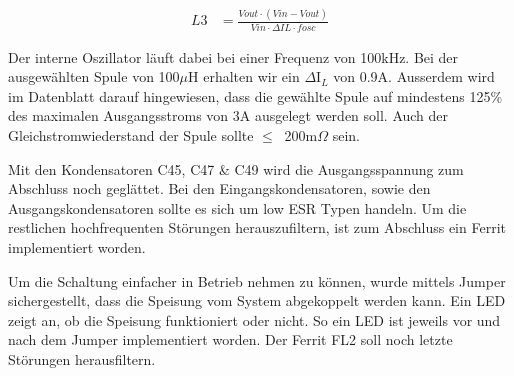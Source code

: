 \begin{align}
L3 &= \frac{Vout \cdot (Vin-Vout)}{Vin \cdot \Delta IL \cdot fosc}
\label{equ:12V_Spulenberechnung}
\end{align}

Der interne Oszillator läuft dabei bei einer Frequenz von 100kHz. Bei der ausgewählten Spule von 100$\mu$H erhalten wir ein $\Delta$I$_{L}$ von 0.9A. Ausserdem wird im Datenblatt darauf hingewiesen, dass die gewählte Spule auf mindestens 125\% des maximalen Ausgangsstroms von 3A ausgelegt werden soll. Auch der Gleichstromwiederstand der Spule sollte $ \leq \ $ 200m$\Omega$  sein. 

Mit den Kondensatoren C45, C47 \& C49 wird die Ausgangsspannung zum Abschluss noch geglättet. Bei den Eingangskondensatoren, sowie den Ausgangskondensatoren sollte es sich um low ESR Typen handeln. Um die restlichen hochfrequenten Störungen herauszufiltern, ist zum Abschluss ein Ferrit implementiert worden.

Um die Schaltung einfacher in Betrieb nehmen zu können, wurde mittels Jumper sichergestellt, dass die Speisung vom System abgekoppelt werden kann. Ein LED zeigt an, ob die Speisung funktioniert oder nicht. So ein LED ist jeweils vor und nach dem Jumper implementiert worden. Der Ferrit FL2 soll noch letzte Störungen herausfiltern.

